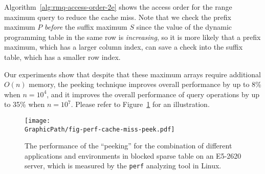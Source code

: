 Algorithm~\ref{alg:rmq-access-order-2e} shows the access order for the
range maximum query to reduce the cache miss.  Note that we check the
prefix maximum $P$ {\em before} the suffix maximum $S$ since the value
of the dynamic programming table in the same row is {\em increasing},
so it is more likely that a prefix maximum, which has a larger column
index, can save a check into the suffix table, which has a smaller row
index.

Our experiments show that despite that these maximum arrays require
additional $O(n)$ memory, the peeking technique improves overall
performance by up to 8\% when $n = 10^4$, and it improves the overall
performance of query operations by up to 35\% when $n = 10^7$.  Please
refer to Figure~\ref{fig:fig-perf-cache-miss-peek} for an illustration.

\begin{figure}
  \centering
  \texttt{[image: \\GraphicPath/fig-perf-cache-miss-peek.pdf]}
  \caption{The performance of the ``peeking'' for
  the combination of different applications and environments in blocked
  sparse table on an E5-2620 server, which is measured by the {\tt perf}
  analyzing tool in Linux.}
  \label{fig:fig-perf-cache-miss-peek}
\end{figure}





